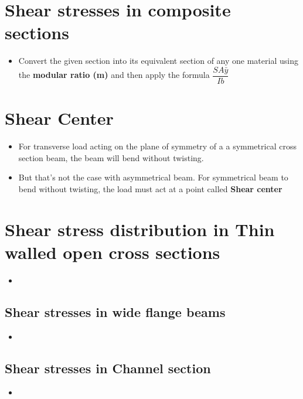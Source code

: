 \documentclass[8pt]{report}
\begin{document}
	\section{Shear stresses in composite sections}
		\begin{itemize}
			\item Convert the given section into its equivalent section of any one material using the \textbf{modular ratio (m)} and then apply the formula $\dfrac{SA\bar{y}}{Ib}$
		\end{itemize}\hrulefill
	\section{Shear Center}
		\begin{itemize}
			\item For transverse load acting on the plane of symmetry of a a symmetrical cross section beam, the beam will bend without twisting. 
			\item But that's not the case with asymmetrical beam. For symmetrical beam to bend without twisting, the load must act at a point called \textbf{Shear center}
		\end{itemize}\hrulefill
	\section{Shear stress distribution in Thin walled open cross sections}
		\begin{itemize}
			\item
		\end{itemize}\hrulefill
	\subsection{Shear stresses in wide flange beams}
		\begin{itemize}
			\item
		\end{itemize}\hrulefill
	\subsection{Shear stresses in Channel section}
		\begin{itemize}
			\item
		\end{itemize}\hrulefill
\end{document}
